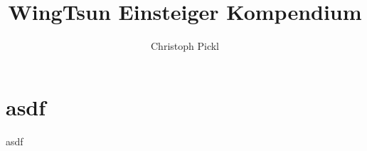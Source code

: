 \documentclass[a4paper,12pt]{scrartcl}
\title{WingTsun Einsteiger Kompendium}
\author{Christoph Pickl}
\begin{document}
\maketitle

\tableofcontents

\newpage

\section{asdf}
asdf
\end{document}
